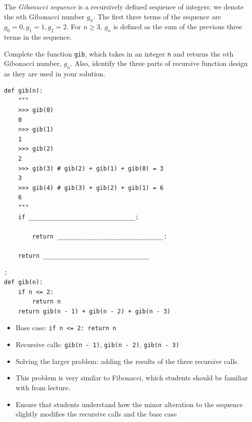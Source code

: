 \begin{blocksection}
\question The \textit{Gibonacci sequence} is a recursively defined sequence of integers; we denote the $n$th Gibonacci number $g_n$. The first three terms of the sequence are $g_0 = 0, g_1 = 1, g_2 = 2$. For $n \geq 3$, $g_n$ is defined as the sum of the previous three terms in the sequence. 

Complete the function \lstinline{gib}, which takes in an integer \lstinline{n} and returns the $n$th Gibonacci number, $g_n$. Also, identify the three parts of recursive function design as they are used in your solution. 

\begin{lstlisting}
def gib(n):
    """
    >>> gib(0)
    0
    >>> gib(1)
    1
    >>> gib(2)
    2
    >>> gib(3) # gib(2) + gib(1) + gib(0) = 3
    3
    >>> gib(4) # gib(3) + gib(2) + gib(1) = 6
    6
    """
    if ______________________________:

        return ______________________________:
        
    return ______________________________
\end{lstlisting}

\begin{solution}[0in]
\begin{lstlisting}:
def gib(n):
    if n <= 2:
        return n
    return gib(n - 1) + gib(n - 2) + gib(n - 3)
\end{lstlisting}

\begin{itemize}
    \item Base case: \lstinline{if n <= 2: return n}
    \item Recursive calls: \lstinline{gib(n - 1)}, \lstinline{gib(n - 2)}, \lstinline{gib(n - 3)}
    \item Solving the larger problem: adding the results of the three recursive calls. 
\end{itemize}
\end{solution}

\begin{questionmeta}
    \begin{itemize}
        \item This problem is very similar to Fibonacci, which students should be familiar with from lecture. 
        \item Ensure that students understand how the minor alteration to the sequence slightly modifies the 
          recursive calls and the base case
    \end{itemize}
\end{questionmeta}

\end{blocksection}

